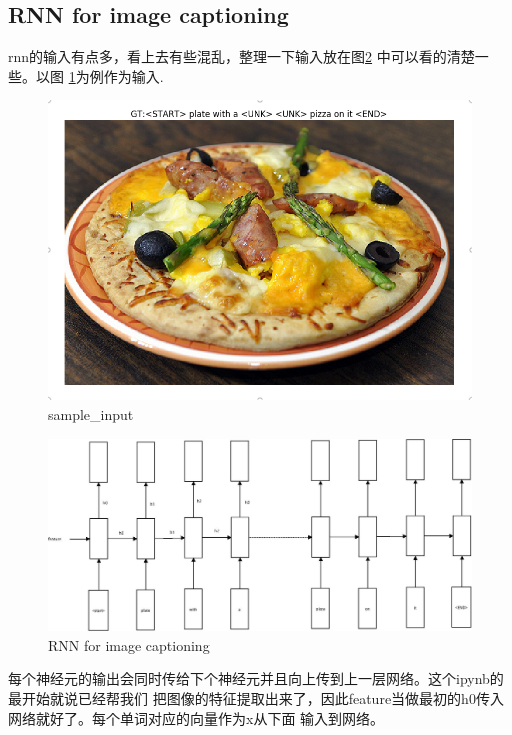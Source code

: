 \documentclass{ctexart}
\begin{document}
\begin{flushleft}
\subsection{RNN for image captioning}
rnn的输入有点多，看上去有些混乱，整理一下输入放在图\ref{fig:rnn for image captioning}
中可以看的清楚一些。以图
\ref{fig:rnn_sample_input}为例作为输入.
\begin{figure}
  \includegraphics[width=5in]{./assignment1_pic/rnn_caption_sample.png}
  \caption{sample\_input}
  \label{fig:rnn_sample_input}
\end{figure}

\begin{figure}
  \includegraphics[width=5in]{./assignment1_pic/rnn_caption_train.jpg}
  \caption{RNN for image captioning}
  \label{fig:rnn for image captioning}
\end{figure}

每个神经元的输出会同时传给下个神经元并且向上传到上一层网络。这个ipynb的最开始就说已经帮我们
把图像的特征提取出来了，因此feature当做最初的h0传入网络就好了。每个单词对应的向量作为x从下面
输入到网络。











\end{flushleft}
\end{document}
